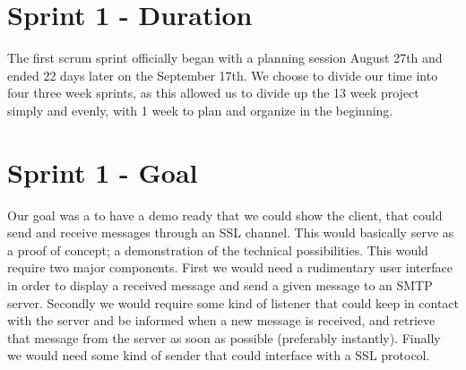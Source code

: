 \section{Sprint 1 - Duration}
The first scrum sprint officially began with a planning session August 27th and ended 22 days later on the September 17th. We choose to divide our time into four three week sprints, as this allowed us to divide up the 13 week project simply and evenly, with 1 week to plan and organize in the beginning.

\section{Sprint 1 - Goal}
Our goal was a to have a demo ready that we could show the client, that could send and receive messages through an SSL channel. This would basically serve as a proof of concept; a demonstration of the technical possibilities. This would require two major components. First we would need a rudimentary user interface in order to display a received message and send a given message to an SMTP server. Secondly we would require some kind of listener that could keep in contact with the server and be informed when a new message is received, and retrieve that message from the server as soon as possible (preferably instantly). Finally we would need some kind of sender that could interface with a SSL protocol.